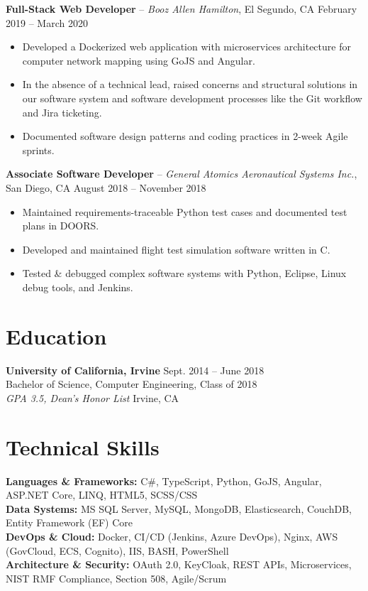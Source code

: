 \documentclass[10pt,letterpaper]{article}
\begin{document}
\vspace{6pt}

\noindent
\textbf{Full-Stack Web Developer} -- \textit{Booz Allen Hamilton}, El Segundo, CA \hfill February 2019 -- March 2020
\begin{itemize}
    \item Developed a Dockerized web application with microservices architecture for computer network mapping using GoJS and Angular.
    \item In the absence of a technical lead, raised concerns and structural solutions in our software system and software development processes like the Git workflow and Jira ticketing.
    \item Documented software design patterns and coding practices in 2-week Agile sprints.
\end{itemize}

\vspace{6pt}

\noindent
\textbf{Associate Software Developer} -- \textit{General Atomics Aeronautical Systems Inc.}, San Diego, CA \hfill August 2018 -- November 2018
\begin{itemize}
    \item Maintained requirements-traceable Python test cases and documented test plans in DOORS.
    \item Developed and maintained flight test simulation software written in C.
    \item Tested \& debugged complex software systems with Python, Eclipse, Linux debug tools, and Jenkins.
\end{itemize}

\section{Education}
\noindent
\textbf{University of California, Irvine} \hfill Sept. 2014 -- June 2018 \\
Bachelor of Science, Computer Engineering, Class of 2018 \\
\textit{GPA 3.5, Dean's Honor List} \hfill Irvine, CA

\section{Technical Skills}
\begin{small}
\noindent \textbf{Languages \& Frameworks:} C\#, TypeScript, Python, GoJS, Angular, ASP.NET Core, LINQ, HTML5, SCSS/CSS \\
\noindent \textbf{Data Systems:} MS SQL Server, MySQL, MongoDB, Elasticsearch, CouchDB, Entity Framework (EF) Core \\
\noindent \textbf{DevOps \& Cloud:} Docker, CI/CD (Jenkins, Azure DevOps), Nginx, AWS (GovCloud, ECS, Cognito), IIS, BASH, PowerShell \\
\noindent \textbf{Architecture \& Security:} OAuth 2.0, KeyCloak, REST APIs, Microservices, NIST RMF Compliance, Section 508, Agile/Scrum
\end{small}
\end{document}
